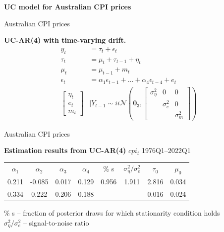 \documentclass[notes,blackandwhite,mathsans,usenames,dvipsnames]{beamer}
\begin{document}
{
\begin{frame}

\begin{adjustwidth}{-0.5cm}{0cm}
\vspace{8.3cm}\Large
\textbf{{\color{mcxs3}UC model for} {\color{mcxs1}Australian CPI prices}}
\end{adjustwidth}

\end{frame}
}






\begin{frame}{Australian CPI prices}

\bigskip\textbf{UC-AR(4) with time-varying drift.}
\begin{align*}
y_t &= \tau_t + \epsilon_t\\[1ex]
\tau_t &= \mu_t + \tau_{t-1} + \eta_t\\[1ex]
\mu_t &= \mu_{t-1} + m_t\\[1ex]
\epsilon_t &= \alpha_1\epsilon_{t-1} + \dots + \alpha_4\epsilon_{t-4} +  e_t\\[2ex]
\begin{bmatrix}\eta_t \\ e_t\\ m_t\end{bmatrix}&\bigg|Y_{t-1} \sim ii\mathcal{N}\left(\mathbf{0}_3, \begin{bmatrix}\sigma_\eta^2 & 0 & 0 \\  & \sigma_e^2 &0 \\
&&\sigma_m^2\end{bmatrix} \right)
\end{align*}

\end{frame}



\begin{frame}{Australian CPI prices}

\begin{adjustwidth}{-0.5cm}{0cm}
\begin{center}
\textbf{Estimation results from UC-AR(4)} {\color{mcxs2}$cpi_t$ 1976Q1--2022Q1}

\small\smallskip\begin{tabular}{cccccccc}
\toprule
$\alpha_1$ & $\alpha_2$ & $\alpha_3$ & $\alpha_4$& \% s  & $\sigma^2_\eta / \sigma^2_e$& $\tau_0$ & $\mu_0$\\[1ex]
 0.211& -0.085&  0.017&  0.129&  0.956&  1.911&  2.816&  0.034\\
0.334& 0.222& 0.206& 0.188&    &    & 0.016& 0.024\\
\bottomrule
\end{tabular}

\smallskip 
\% s -- fraction of posterior draws for which stationarity condition holds\\
$\sigma^2_\eta / \sigma^2_e$ -- signal-to-noise ratio
\end{center}
\end{adjustwidth}
\end{frame}
\end{document}
